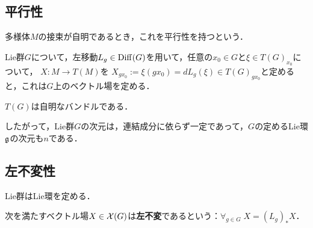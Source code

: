 \documentclass[uplatex,dvipdfmx]{jsreport}
\begin{document}
\subsection{平行性}

\begin{tcolorbox}[colframe=ForestGreen, colback=ForestGreen!10!white,breakable,colbacktitle=ForestGreen!40!white,coltitle=black,fonttitle=\bfseries\sffamily,
title=]
    多様体$M$の接束が自明であるとき，これを平行性を持つという．
\end{tcolorbox}

\begin{lemma}
    Lie群$G$について，左移動$L_g\in\mathrm{Diff}(G)$を用いて，任意の$x_0\in G$と$\xi\in T(G)_{x_0}$について，
    $X:M\to T(M)$を
    $X_{gx_0}:=\xi(gx_0)=dL_g(\xi)\in T(G)_{gx_0}$と定めると，これは$G$上のベクトル場を定める．
\end{lemma}

\begin{corollary}
    $T(G)$は自明なバンドルである．
\end{corollary}

\begin{definition}
    したがって，Lie群$G$の次元は，連結成分に依らず一定であって，$G$の定めるLie環$\mathfrak{g}$の次元も$n$である．
\end{definition}

\subsection{左不変性}

\begin{tcolorbox}[colframe=ForestGreen, colback=ForestGreen!10!white,breakable,colbacktitle=ForestGreen!40!white,coltitle=black,fonttitle=\bfseries\sffamily,
title=]
    Lie群はLie環を定める．
\end{tcolorbox}

\begin{definition}
    次を満たすベクトル場$X\in\mathcal{X}(G)$は\textbf{左不変}であるという：$\forall_{g\in G}\;X=(L_g)_*X$．
\end{definition}
\end{document}
